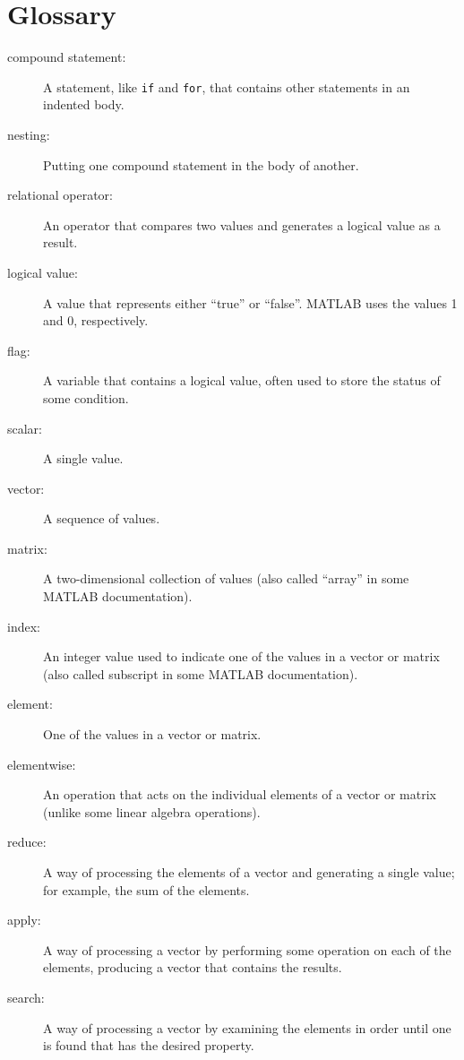 \documentclass[
]{book}
\numberwithin{Answer}{chapter}
\numberwithin{Exercise}{chapter}
\begin{document}
\section{Glossary}

\begin{description}

\item[compound statement:] A statement, like {\tt if} and {\tt for}, that
contains other statements in an indented body.

\item[nesting:] Putting one compound statement in the body of another.

\item[relational operator:] An operator that compares two values and
generates a logical value as a result.

\item[logical value:] A value that represents either ``true'' or
``false''.  MATLAB uses the values 1 and 0, respectively.

\item[flag:] A variable that contains a logical value, often used
to store the status of some condition.

\item[scalar:] A single value.

\item[vector:] A sequence of values.

\item[matrix:] A two-dimensional collection of values (also called
``array'' in some MATLAB documentation).

\item[index:] An integer value used to indicate one of the values
in a vector or matrix (also called subscript in some MATLAB documentation).

\item[element:] One of the values in a vector or matrix.

\item[elementwise:] An operation that acts on the individual elements
of a vector or matrix (unlike some linear algebra operations).

\item[reduce:] A way of processing the elements of a vector and
generating a single value; for example, the sum of the elements.

\item[apply:] A way of processing a vector by performing some operation
on each of the elements, producing a vector that contains the
results.

\item[search:] A way of processing a vector by examining the
elements in order until one is found that has the desired property.

\end{description}
\end{document}
